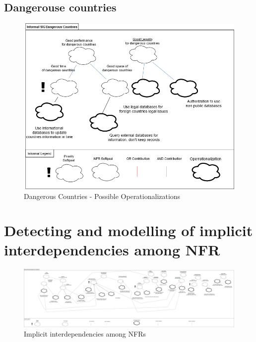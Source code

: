 \documentclass{VUMIFPSkursinis}
\begin{document}
\begin{landscape}
	\subsection{Dangerouse countries}
		\begin{figure}[H]
			\center
			\includegraphics[scale=0.5]{img/Dangerous-Countries-3}
			\caption{Dangerous Countries - Possible Operationalizations} %
			\label{img:kurimoProcesas}
		\end{figure}	

\section{Detecting and modelling of implicit interdependencies among NFR}
	\begin{figure}[H]
		\center
		\includegraphics[scale=0.2]{img/Negative-Interdependancies}
		\caption{Implicit interdependencies among NFRs} %
		\label{img:kurimoProcesas}
	\end{figure}


\end{landscape}
\end{document}
